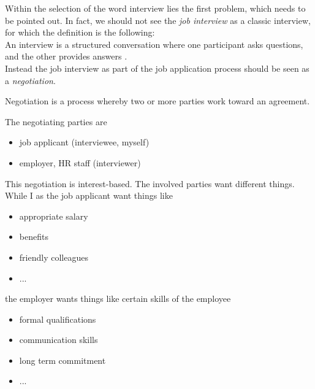 \noindent Within the selection of the word interview lies the first problem, which needs
to be pointed out. In fact, we should not see the
\emph{job interview} as a classic interview, for which the definition
is the following: \\

\noindent An interview is a structured conversation where one participant asks questions, and the other provides answers \autocite{merriamWebsterDefinitionInterview}. \\

\noindent Instead the job interview as part of the job application process
should be seen as a \emph{negotiation}. \\

\begin{center}
	\noindent Negotiation is a process whereby two or
	more parties work toward an agreement.
\end{center}


\noindent The negotiating parties are

\begin{itemize}
	\item job applicant (interviewee, myself)
	\item employer, HR staff (interviewer)
\end{itemize}


\noindent This negotiation is interest-based. The involved parties want different things.
While I as the job applicant want things like

\begin{itemize}
	\item appropriate salary
	\item benefits
	\item friendly colleagues
	\item ...
\end{itemize}

\noindent the employer wants things like certain skills of the employee

\begin{itemize}
	\item formal qualifications
	\item communication skills
	\item long term commitment
	\item ...
\end{itemize}




























